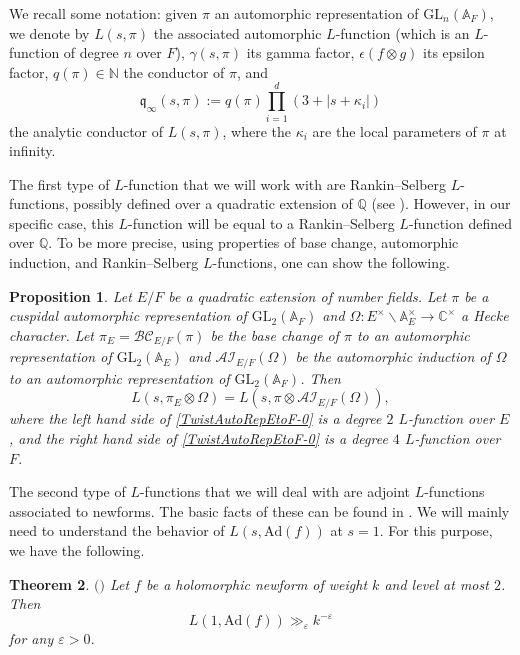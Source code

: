 \documentclass[11pt]{amsart}
\newcommand{\N}{\mathbb{N}}
\newcommand{\Q}{\mathbb{Q}}
\newcommand{\C}{\mathbb{C}}
\newcommand{\A}{\mathbb{A}}
\newtheorem{theorem}{Theorem}[section]
\newtheorem{proposition}[theorem]{Proposition}
\theoremstyle{definition}
\theoremstyle{remark}
\begin{document}
We recall some notation: given $\pi$ an automorphic representation of $\mathrm{GL}_n(\A_F)$, we denote by $L(s,\pi)$ the associated automorphic $L$-function (which is an $L$-function of degree $n$ over $F$), $\gamma(s,\pi)$ its gamma factor, $\epsilon(f\otimes g)$ its epsilon factor, $q(\pi)\in \N$ the conductor of $\pi$, and $$ \mathfrak{q}_{\infty}(s,\pi) := q(\pi) \prod_{i=1}^{d} (3+|s+\kappa_i|)$$ the analytic conductor of $L(s,\pi)$, where the $\kappa_i$ are the local parameters of $\pi$ at infinity.

The first type of $L$-function that we will work with are Rankin--Selberg $L$-functions, possibly defined over a quadratic extension of $\Q$ (see \cite[\S 5.1, 5.11]{IwaniecKowalski}). However, in our specific case, this $L$-function will be equal to a Rankin--Selberg $L$-function defined over $\Q$. To be more precise, using properties of base change, automorphic induction, and Rankin--Selberg $L$-functions, one can show the following.

\begin{proposition}\label{TwistAutoRepEtoF}
Let $E/F$ be a quadratic extension of number fields. Let $\pi$ be a cuspidal automorphic representation of $\mathrm{GL}_{2}(\A_F)$ and $\Omega:E^{\times} \backslash \A_{E}^{\times} \rightarrow \C^{\times}$ a Hecke character. Let $\pi_E = \mathcal{BC}_{E/F}(\pi)$ be the base change of $\pi$ to an automorphic representation of $\mathrm{GL}_2(\A_{E})$ and $\mathcal{AI}_{E/F}(\Omega)$ be the automorphic induction of $\Omega$ to an automorphic representation of $\mathrm{GL}_{2}(\A_{F})$. Then 
\begin{equation}
    L(s,\pi_E \otimes \Omega) = L(s,\pi\otimes \mathcal{AI}_{E/F}(\Omega)), \label{TwistAutoRepEtoF-0}
\end{equation}
where the left hand side of \eqref{TwistAutoRepEtoF-0} is a degree $2$ $L$-function over $E$, and the right hand side of \eqref{TwistAutoRepEtoF-0} is a degree $4$ $L$-function over $F$.
\end{proposition}

The second type of $L$-functions that we will deal with are adjoint $L$-functions associated to newforms. The basic facts of these can be found in \cite[\S 5.12]{IwaniecKowalski}. We will mainly need to understand the behavior of $L(s,\mathrm{Ad}(f))$ at $s=1$. For this purpose, we have the following.

\begin{theorem}\label{AdjointBound}
$\mathrm{(}$\cite[Thm. 0.2]{AdjointBound}$\mathrm{)}$ Let $f$ be a holomorphic newform of weight $k$ and level at most $2$. Then $$ L(1,\mathrm{Ad}(f)) \gg_{\varepsilon} k^{-\varepsilon}$$ for any $\varepsilon>0$.
\end{theorem}
\end{document}
